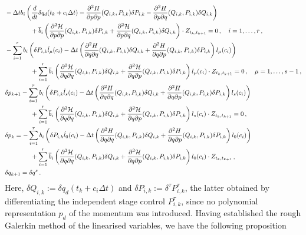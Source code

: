 \documentclass[11pt, oneside]{article}
\numberwithin{equation}{section}
\theoremstyle{definition}
\newcommand{\ob}[1]{\overline{#1}}
\newcommand{\mc}[1]{\mathcal{#1}}
\newcommand{\mcal}[1]{\mc{#1}}
\def\p{{\partial}}
\def\p{\partial}
\begin{document}
\begin{subequations}
    \label{eq:lin galerkin stat cond}
    \begin{align}
        & - \Delta t b_i\left(\frac{d}{dt}\delta q_d(t_k + c_i\Delta t) - \frac{\p^2 H}{\p p \p p}(Q_{i,k}, P_{i,k})\delta P_{i,k} - \frac{\p^2 H}{\p p \p q}(Q_{i,k}, P_{i,k})\delta Q_{i,k}\right) \notag\\
        & \qquad \qquad + \ob{b}_i\left(\frac{\p^2 \mcal{H}}{\p p \p p}(Q_{i,k}, P_{i,k})\delta P_{i,k} + \frac{\p^2 \mcal{H}}{\p p \p q}(Q_{i,k}, P_{i,k})\delta Q_{i,k}\right) \cdot Z_{t_k, t_{k+1}} = 0\,,\quad i = 1,\ldots,r\,,\\
        & -  \sum_{i=1}^r b_i\left( \delta P_{i,k} \dot{l}_\mu(c_i) - \Delta t \left(\frac{\p^2 H}{\p q\p q}(Q_{i,k}, P_{i,k})\delta Q_{i,k} + \frac{\p^2 H}{\p q\p p}(Q_{i,k}, P_{i,k})\delta P_{i,k}\right)l_\mu(c_i)\right) \notag\\
        &\qquad \qquad + \sum_{i=1}^r \ob{b}_i\left(\frac{\p^2 \mcal{H}}{\p q \p q}(Q_{i,k}, P_{i,k})\delta Q_{i,k} + \frac{\p^2 \mcal{H}}{\p q \p p}(Q_{i,k}, P_{i,k})\delta P_{i,k}\right)l_\mu(c_i)\cdot Z_{t_k, t_{k+1}} = 0\,, \quad \mu=1,\ldots,s-1\,,\\
        &\delta p_{k+1} - \sum_{i=1}^r b_i\left( \delta P_{i,k} \dot{l}_s(c_i) - \Delta t \left(\frac{\p^2 H}{\p q\p q}(Q_{i,k}, P_{i,k})\delta Q_{i,k} + \frac{\p^2 H}{\p q\p p}(Q_{i,k}, P_{i,k})\delta P_{i,k}\right)l_s(c_i)\right)\notag \\
        &\qquad \qquad + \sum_{i=1}^r \ob{b}_i\left(\frac{\p^2 \mcal{H}}{\p q \p q}(Q_{i,k}, P_{i,k})\delta Q_{i,k} + \frac{\p^2 \mcal{H}}{\p q \p p}(Q_{i,k}, P_{i,k})\delta P_{i,k}\right)l_s(c_i)\cdot Z_{t_k, t_{k+1}} = 0\,,\\
        &\delta p_k = - \sum_{i=1}^r b_i\left( \delta P_{i,k} \dot{l}_0(c_i) - \Delta t \left(\frac{\p^2 H}{\p q\p q}(Q_{i,k}, P_{i,k})\delta Q_{i,k} + \frac{\p^2 H}{\p q\p p}(Q_{i,k}, P_{i,k})\delta P_{i,k}\right)l_0(c_i)\right) \notag\\
        & \qquad \qquad + \sum_{i=1}^r \ob{b}_i\left(\frac{\p^2 \mcal{H}}{\p q \p q}(Q_{i,k}, P_{i,k})\delta Q_{i,k} + \frac{\p^2 \mcal{H}}{\p q \p p}(Q_{i,k}, P_{i,k})\delta P_{i,k}\right)l_0(c_i)\cdot Z_{t_k, t_{k+1}} \,,\\
        &\delta q_{k+1} = \delta q^s\,. 
\end{align}    
\end{subequations}
Here, $\delta Q_{i,k} := \delta q_d(t_k + c_i\Delta t)$ and $\delta P_{i,k} := \delta^\tau P^\tau_{i,k}$, the latter obtained by differentiating the independent stage control $P^\tau_{i,k}$, since no polynomial representation $p_d$ of the momentum was introduced. Having established the rough Galerkin method of the linearised variables, we have the following proposition
\end{document}
